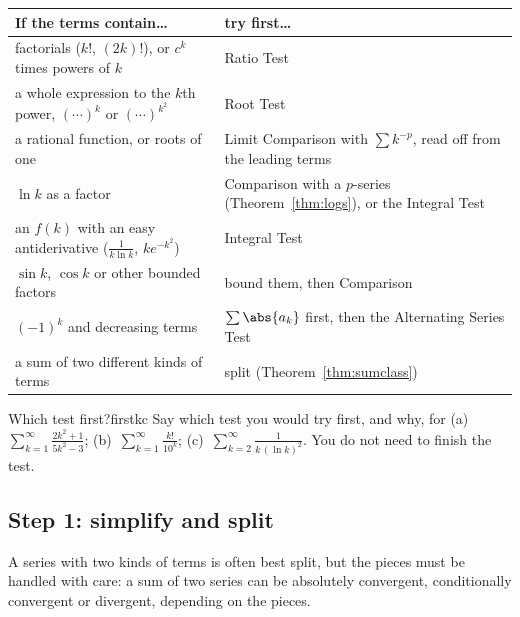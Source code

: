 \documentclass[11pt]{article}
\begin{document}
\noindent\begingroup\small\setlength{\tabcolsep}{3pt}\renewcommand{\arraystretch}{1.2}
\begin{tabular}{@{}>{\raggedright\arraybackslash}p{2.55in}>{\raggedright\arraybackslash}p{3.4in}@{}}\toprule
\textbf{If the terms contain\dots} & \textbf{try first\dots}\\\midrule
factorials ($k!$, $(2k)!$), or $c^k$ times powers of $k$ & Ratio Test\\
a whole expression to the $k$th power, $(\cdots)^k$ or $(\cdots)^{k^2}$ & Root Test\\
a rational function, or roots of one & Limit Comparison with $\sum k^{-p}$, read off from the leading terms\\
$\ln k$ as a factor & Comparison with a $p$-series (Theorem~\ref{thm:logs}), or the Integral Test\\
an $f(k)$ with an easy antiderivative ($\frac1{k\ln k}$, $ke^{-k^2}$) & Integral Test\\
$\sin k$, $\cos k$ or other bounded factors & bound them, then Comparison\\
$(-1)^k$ and decreasing terms & $\sum\abs{a_k}$ first, then the Alternating Series Test\\
a sum of two different kinds of terms & split (Theorem~\ref{thm:sumclass})\\\bottomrule
\end{tabular}
\endgroup

\begin{kc}{Which test first?}{firstkc}
Say which test you would try first, and why, for (a)~$\displaystyle\sum_{k=1}^\infty\frac{2k^2+1}{5k^2-3}$; \quad (b)~$\displaystyle\sum_{k=1}^\infty\frac{k!}{10^k}$; \quad (c)~$\displaystyle\sum_{k=2}^\infty\frac1{k\,(\ln k)^2}$. You do not need to finish the test.
\end{kc}

\subsection*{Step 1: simplify and split}

A series with two kinds of terms is often best split, but the pieces must be handled with care: a sum of two series can be absolutely convergent, conditionally convergent or divergent, depending on the pieces.
\end{document}
